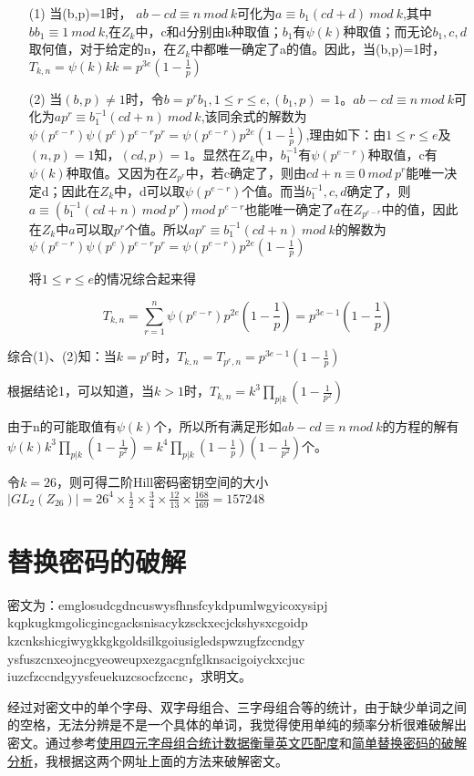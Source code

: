 \documentclass{article}
\begin{document}
\begin{itemize}
	\item [(1)]
	当(b,p)=1时，
	$ab-cd\equiv n\ mod\ k$可化为$a\equiv b_1(cd+d)\ mod\ k$,其中$bb_1\equiv1\ mod\ k$,在$Z_k$中，c和d分别由k种取值；$b_1$有$\psi(k)$种取值；而无论$b_1,c,d$取何值，对于给定的n，在$Z_k$中都唯一确定了a的值。因此，当(b,p)=1时，$T_{k,n}=\psi(k)kk=p^{3e}(1-\frac{1}{p})$
	\item [(2)]
	当$(b,p)\neq 1$时，令$b=p^rb_1,1 \le r\le e,(b_1,p)=1$。$ab-cd\equiv n\ mod\ k$可化为$ap^r\equiv b_1^{-1}(cd+n)\ mod\ k$,该同余式的解数为$\psi(p^{e-r})\psi(p^e)p^{e-r}p^r=\psi(p^{e-r})p^{2e}(1-\frac{1}{p})$,理由如下：由$1\le r \le e$及$(n,p)=1$知，$(cd,p)=1$。显然在$Z_k$中，$b_1^{-1}$有$\psi(p^{e-r})$种取值，c有$\psi(k)$种取值。又因为在$Z_{p^r}$中，若c确定了，则由$cd +n\equiv 0\ mod\ p^r$能唯一决定d；因此在$Z_k$中，d可以取$\psi(p^{e-r})$个值。而当$b_1^{-1},c,d$确定了，则$a\equiv(b_1^{-1}(cd+n)\ mod\ p^r)mod\ p^{e-r}$也能唯一确定了$a$在$Z_{p^{e-r}}$中的值，因此在$Z_k$中$a$可以取$p^r$个值。所以$ap^r\equiv b_1^{-1}(cd+n)\ mod\ k$的解数为$\psi(p^{e-r})\psi(p^e)p^{e-r}p^r=\psi(p^{e-r})p^{2e}(1-\frac{1}{p})$

	将$1\le r\le e$的情况综合起来得

	$$T_{k,n}=\sum_{r=1}^{n}\psi(p^{e-r})p^{2e}(1-\frac{1}{p})=p^{3e-1}(1-\frac{1}{p})$$
\end{itemize}
综合(1)、(2)知：当$k=p^e$时，$T_{k,n}=T_{p^e,n}=p^{3e-1}(1-\frac{1}{p})$

根据结论1，可以知道，当$k>1$时，$T_{k,n}=k^3\prod_{p|k}(1-\frac{1}{p^2})$

由于n的可能取值有$\psi(k)$个，所以所有满足形如$ab-cd\equiv n\ mod\ k$的方程的解有$\psi(k)k^3\prod_{p|k}(1-\frac{1}{p^2})=k^4\prod_{p|k}(1-\frac{1}{p})(1-\frac{1}{p^2})$个。

令$k=26$，则可得二阶Hill密码密钥空间的大小$|GL_2(Z_{26})|=26^4×\frac{1}{2}×\frac{3}{4}×\frac{12}{13}×\frac{168}{169}=157248$

\section*{替换密码的破解}

密文为：emglosudcgdncuswysfhnsfcykdpumlwgyicoxysipj
kqpkugkmgolicgincgacksnisacykzsckxecjckshysxcgoidp
kzcnkshicgiwygkkgkgoldsilkgoiusigledspwzugfzccndgy
ysfuszcnxeojncgyeoweupxezgacgnfglknsacigoiyckxcjuc
iuzcfzccndgyysfeuekuzcsocfzccnc，求明文。

经过对密文中的单个字母、双字母组合、三字母组合等的统计，由于缺少单词之间的空格，无法分辨是不是一个具体的单词，我觉得使用单纯的频率分析很难破解出密文。通过参考\href{http://practicalcryptography.com/cryptanalysis/text-characterisation/quadgrams/}{使用四元字母组合统计数据衡量英文匹配度}和\href{http://www.practicalcryptography.com/cryptanalysis/stochastic-searching/cryptanalysis-simple-substitution-cipher/}{简单替换密码的破解分析}，我根据这两个网址上面的方法来破解密文。
\end{document}
